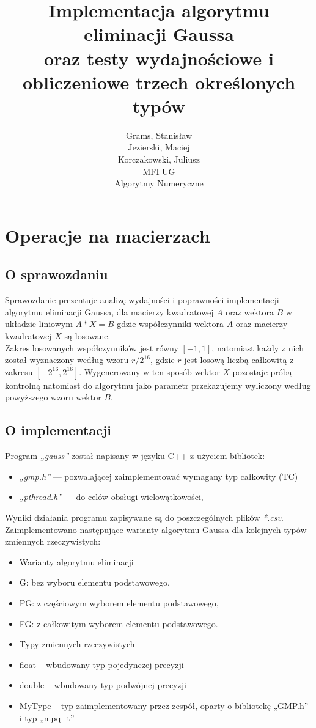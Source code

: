 \documentclass[10pt]{article}
\begin{document}
\title{Implementacja algorytmu eliminacji Gaussa\\oraz testy wydajnościowe i obliczeniowe trzech określonych typów}
\author{Grams, Stanisław\\Jezierski, Maciej\\Korczakowski, Juliusz\\ MFI UG\\Algorytmy Numeryczne}

\maketitle
\section {Operacje na macierzach}
\subsection{O sprawozdaniu}
Sprawozdanie prezentuje analizę wydajności i poprawności implementacji algorytmu eliminacji Gaussa, dla macierzy kwadratowej $A$ oraz wektora $B$ w układzie liniowym $A*X = B$ gdzie współczynniki wektora $A$ oraz macierzy kwadratowej $X$ są losowane. \\
Zakres losowanych współczynników jest równy $[-1, 1]$, natomiast każdy z nich został wyznaczony według wzoru $r/2^{16}$, gdzie $r$ jest losową liczbą całkowitą z zakresu $[-2^{16} , 2^{16}]$.
Wygenerowany w ten sposób wektor $X$ pozostaje próbą kontrolną natomiast do algorytmu jako parametr przekazujemy wyliczony według powyższego wzoru wektor $B$.
\subsection{O implementacji}
Program \textit{„gauss”} został napisany w języku C++ z użyciem bibliotek:
\begin{itemize}
    \item \textit{„gmp.h”} — pozwalającej zaimplementować wymagany typ całkowity (TC)
    \item \textit{„pthread.h”} — do celów obsługi wielowątkowości,
\end{itemize}
Wyniki działania programu zapisywane są do poszczególnych plików \textit{*.csv}.
Zaimplementowano następujące warianty algorytmu Gaussa dla kolejnych typów zmiennych rzeczywistych:
\begin{itemize}
\item[] Warianty algorytmu eliminacji
    \item G: bez wyboru elementu podstawowego,
    \item PG: z częściowym wyborem elementu podstawowego, 
    \item FG: z całkowitym wyborem elementu podstawowego.
\item[] Typy zmiennych rzeczywistych
    \item {float} – wbudowany typ pojedynczej precyzji 
    \item {double} – wbudowany typ podwójnej precyzji
    \item {MyType} – typ zaimplementowany przez zespół, oparty o bibliotekę „GMP.h” i typ „mpq\_t”
\end{itemize}
\end{document}
